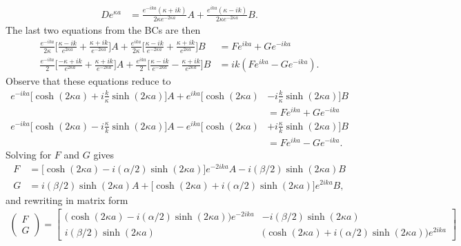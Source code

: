 {\begin{align}
    De^{\kappa a} &= \frac{e^{-ika} (\kappa + ik)}{2 \kappa e^{-2\kappa a}} A + \frac{e^{ika} (\kappa - ik)}{2 \kappa e^{-2 \kappa a}} B
.\end{align}
The last two equations from the BCs are then
\begin{align}
    \frac{e^{-ika}}{2\kappa} \Bigg[ \frac{\kappa - ik}{e^{2 \kappa a}} + \frac{\kappa + ik}{e^{-2\kappa a}} \Bigg] A + \frac{e^{ika}}{2\kappa} \Bigg[ \frac{\kappa - ik}{e^{-2 \kappa a}} + \frac{\kappa + ik}{e^{2 \kappa a}} \Bigg] B &= F e^{ika} + G e^{-ika} \\
    \frac{e^{-ika}}{2} \Bigg[ \frac{-\kappa + ik}{e^{2 \kappa a}} + \frac{\kappa + ik}{e^{-2\kappa a}} \Bigg] A + \frac{e^{ika}}{2} \Bigg[ \frac{\kappa - ik}{e^{-2 \kappa a}} - \frac{\kappa + ik}{e^{2 \kappa a}} \Bigg] B &= ik( F e^{ika} - G e^{-ika} )
.\end{align}
Observe that these equations reduce to
\begin{align}
    e^{-ika} \Big[ \cosh(2 \kappa a) + i \frac{k}{\kappa} \sinh(2 \kappa a) \Big] A + e^{ika} \Big[ \cosh(2 \kappa a) &- i \frac{k}{\kappa} \sinh(2 \kappa a) \Big] B \nonumber \\
    &= Fe^{ika} + G e^{-ika} \\
    e^{-ika} \Big[ \cosh(2 \kappa a) - i \frac{\kappa}{k} \sinh(2 \kappa a) \Big] A - e^{ika} \Big[ \cosh(2 \kappa a) &+ i \frac{\kappa}{k} \sinh(2 \kappa a) \Big] B \nonumber \\
    &= Fe^{ika} - Ge^{-ika}
.\end{align}
Solving for $F$ and $G$ gives
\begin{align}
    F &= \Big[ \cosh(2 \kappa a) - i (\alpha/2) \sinh(2 \kappa a) \Big] e^{-2ika} A - i (\beta/2) \sinh(2 \kappa a) B \\
    G &= i (\beta/2) \sinh(2 \kappa a) A + \Big[ \cosh(2 \kappa a) + i(\alpha/2) \sinh(2 \kappa a) \Big] e^{2ika} B
,\end{align}
and rewriting in matrix form
\begin{eqnarray}
    \begin{pmatrix}
    F \\ G
    \end{pmatrix}
    = \begin{bmatrix}
        \Big( \cosh(2 \kappa a) - i (\alpha/2) \sinh(2 \kappa a) \Big) e^{-2ika} & - i (\beta/2) \sinh(2 \kappa a) \\
        i (\beta/2) \sinh(2 \kappa a) & \Big( \cosh(2 \kappa a) + i(\alpha/2) \sinh(2 \kappa a) \Big) e^{2ika}
    \end{bmatrix}

\end{eqnarray}}
